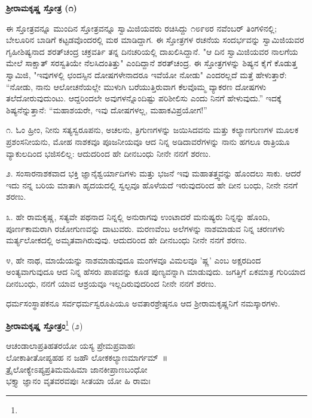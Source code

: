 \begin{center}
\textbf{ಶ‍್ರೀರಾಮಕೃಷ್ಣ ಸ್ತೋತ್ರ (೧)}
\end{center}

ಈ ಸ್ತೋತ್ರವನ್ನೂ ಮುಂದಿನ ಸ್ತೋತ್ರವನ್ನೂ ಸ್ವಾಮಿಜಿಯವರು ರಚಿಸಿದ್ದು ೧೮೯೮ರ ನವೆಂಬರ್ ತಿಂಗಳಿನಲ್ಲಿ; ಬೇಲೂರಿನ ಬಾಡಿಗೆ ಕಟ್ಟಡವೊಂದರಲ್ಲಿ ಮಠ ಮಾಡಿದ್ದಾಗ. ಈ ಸ್ತೋತ್ರಗಳ ರಚನೆಯ ಸಂದರ್ಭವನ್ನು ಸ್ವಾಮಿಜಿಯವರ ಗೃಹೀಶಿಷ್ಯನಾದ ಶರತ್‌ಚಂದ್ರ ಚಕ್ರವರ್ತಿ ತನ್ನ ದಿನಚರಿಯಲ್ಲಿ ದಾಖಲಿಸಿದ್ದಾನೆ. "ಆ ದಿನ ಸ್ವಾಮಿಜಿಯವರ ನಾಲಗೆಯ ಮೇಲೆ ಸಾಕ್ಷಾತ್ ಸರಸ್ವತಿಯೇ ನೆಲಸಿದಂತಿತ್ತು" ಎಂದಿದ್ದಾನೆ ಶರತ್‌ಚಂದ್ರ. ಈ ಸ್ತೋತ್ರಗಳನ್ನು ಶಿಷ್ಯನ ಕೈಗೆ ಕೊಡುತ್ತ ಸ್ವಾಮಿಜಿ, "ಇವುಗಳಲ್ಲಿ ಛಂದಸ್ಸಿನ ದೋಷಗಳೇನಾದರೂ ಇವೆಯೋ ನೋಡು" ಎಂದರಲ್ಲದೆ ಮತ್ತೆ ಹೇಳುತ್ತಾರೆ: “ನೋಡು, ನಾನು ಆಲೋಚನೆಯಲ್ಲೇ ಮುಳುಗಿ ಬರೆಯುತ್ತಿರುವಾಗ ಕೆಲವೊಮ್ಮ ವ್ಯಾಕರಣ ದೋಷಗಳು ತಲೆದೋರುವುದುಂಟು. ಆದ್ದರಿಂದಲೇ ಅವುಗಳನ್ನೊಂದಿಷ್ಟು ಪರಿಶೀಲಿಸು ಎಂದು ನಿನಗೆ ಹೇಳುವುದು.” ಇದಕ್ಕೆ ಶಿಷ್ಯನೆನ್ನುತ್ತಾನೆ: “ಮಹಾಶಯರೇ, ಇವು ದೋಷಗಳಲ್ಲ, ಮಹಾಕವಿಪ್ರಯೋಗ!”

೧. ಓಂ ಹ್ರೀಂ, ನೀನು ಸತ್ಯಸ್ವರೂಪನು, ಅಚಲನು, ತ್ರಿಗುಣಗಳನ್ನು ಜಯಿಸಿದವನು ಮತ್ತು ಕಲ್ಯಾಣಗುಣಗಳ ಮೂಲಕ ಪ್ರಶಂಸನೀಯನು, ಮೋಹ ನಾಶಕವೂ ಪೂಜನೀಯವೂ ಆದ ನಿನ್ನ ಅಡಿದಾವರೆಗಳನ್ನು ನಾನು ಹಗಲೂ ರಾತ್ರಿಯೂ ವ್ಯಾಕುಲದಿಂದ ಭಜಿಸಲಿಲ್ಲ: ಆದುದರಿಂದ ಹೇ ದೀನಬಂಧು ನೀನೇ ನನಗೆ ಶರಣು.

೨. ಸಂಸಾರನಾಶಕವಾದ ಭಕ್ತಿ ಜ್ಞಾನೈಶ್ವರ್ಯಾದಿಗಳು ಮತ್ತು ಭಜನೆ ಇವು ಮಹಾತತ್ತ್ವವನ್ನು ಹೊಂದಲು ಸಾಕು. ಆದರೆ ಇದು ನನ್ನ ಬರಿಯ ಮಾತಾಗಿ ಹೃದಯದಲ್ಲಿ ಸ್ವಲ್ಪವೂ ಹೊಳೆಯದೆ ಇರುವುದರಿಂದ ಹೇ ದೀನ ಬಂಧು, ನೀನೇ ನನಗೆ ಶರಣು.

೩. ಹೇ ರಾಮಕೃಷ್ಣ, ಸತ್ಯವೇ ಪಥನಾದ ನಿನ್ನಲ್ಲಿ ಅನುರಾಗವು ಉಂಟಾದರೆ ಮನುಷ್ಯರು ನಿನ್ನನ್ನು ಹೊಂದಿ, ಪೂರ್ಣಕಾಮರಾಗಿ ರಜೋಗುಣವನ್ನು ದಾಟುವರು. ಮರಣವೆಂಬ ಅಲೆಗಳನ್ನು ನಾಶಮಾಡುವ ನಿನ್ನ ಚರಣಗಳು ಮರ್ತ್ಯಲೋಕದಲ್ಲಿ ಅಮೃತವಾಗಿರುವುವು. ಆದುದರಿಂದ ಹೇ ದೀನಬಂಧು ನೀನೇ ನನಗೆ ಶರಣು.

೪, ಹೇ ನಾಥ, ಮಾಯೆಯನ್ನು ನಾಶಮಾಡುವುದೂ ಮಂಗಳವೂ ವಿಮಲವೂ 'ಷ್ಣ' ಎಂಬ ಅಕ್ಷರದಿಂದ ಅಂತ್ಯವಾಗುವುದೂ ಆದ ನಿನ್ನ ಹೆಸರು ಪಾಪವನ್ನು ಕೂಡ ಪುಣ್ಯವನ್ನಾಗಿ ಮಾಡುವುದು. ಜಗತ್ತಿಗೆ ಏಕಮಾತ್ರ ಗುರಿಯಾದ ದೀನಬಂಧು, ನನಗೆ ಯಾವ ಆಶ್ರಯವೂ ಇಲ್ಲದಿರುವುದರಿಂದ ನೀನೇ ನನಗೆ ಶರಣು.

ಧರ್ಮಸಂಸ್ಥಾಪಕನೂ ಸರ್ವಧರ್ಮಸ್ವರೂಪಿಯೂ ಅವತಾರಶ್ರೇಷ್ಠನೂ ಆದ ಶ‍್ರೀರಾಮಕೃಷ್ಣನಿಗೆ ನಮಸ್ಕಾರಗಳು.

\begin{center}
\textbf{ಶ‍್ರೀರಾಮಕೃಷ್ಣ ಸ್ತೋತ್ರಂ}\footnote{} (೨)
\end{center}

\begin{myquote}
ಆಚಂಡಾಲಾಪ್ರತಿಹತರಯೋ ಯಸ್ಯ ಪ್ರೇಮಪ್ರವಾಹಃ\\ಲೋಕಾತೀತೋಪ್ಯಹಹ ನ ಜಹೌ ಲೋಕಕಲ್ಯಾಣಮಾರ್ಗಮ್~॥\\
ತ್ರೈಲೋಕ್ಯೇಽಪ್ಯಪ್ರತಿಮಮಹಿಮಾ ಜಾನಕೀಪ್ರಾಣಬಂಧೋ\\ಭಕ್ತ್ಯಾ ಜ್ಞಾನಂ ವೃತವರವಪುಃ ಸೀತಯಾ ಯೋ ಹಿ ರಾಮಃ
\end{myquote}


